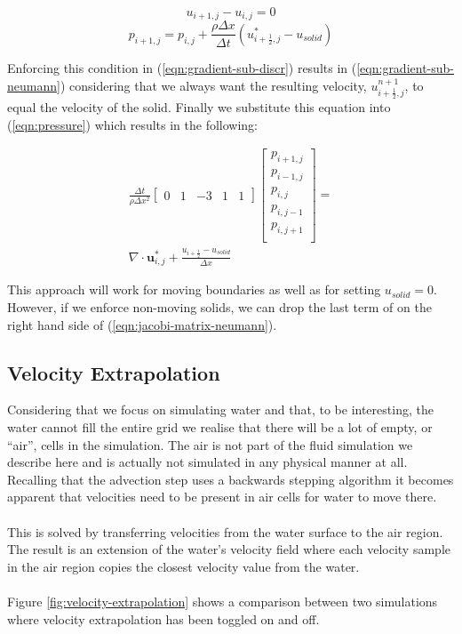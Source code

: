 \documentclass[twocolumn]{article}
\begin{document}
\begin{equation}
  u_{i+1, j} - u_{i, j} = 0
\label{eqn:boundary-neumann}
\end{equation}
\begin{equation}
  p_{i+1, j} = p_{i, j} + \frac{\rho \Delta x}{\Delta t}
    (u_{i+\frac{1}{2}, j}^* - u_{solid})
\label{eqn:gradient-sub-neumann}
\end{equation}

Enforcing this condition in (\ref{eqn:gradient-sub-discr}) results in (\ref{eqn:gradient-sub-neumann}) considering that we always want the resulting velocity, $u_{i+\frac{1}{2}, j}^{n+1}$, to equal the velocity of the solid. Finally we substitute this equation into (\ref{eqn:pressure}) which results in the following:

\begin{equation}
\begin{split}
  \frac{\Delta t}{\rho \Delta x^2}
    \begin{bmatrix}
        0 & 1 & -3 & 1 & 1
    \end{bmatrix}
    \begin{bmatrix}
      p_{i+1, j}\\
      p_{i-1, j}\\
      p_{i, j}\\
      p_{i, j-1}\\
      p_{i, j+1}\\
    \end{bmatrix} =\\
    \nabla \cdot \mathbf{u}^*_{i, j} +
    \frac{u_{i+\frac{1}{2}} - u_{solid}}{\Delta x}
\end{split}
\label{eqn:jacobi-matrix-neumann}
\end{equation}

This approach will work for moving boundaries as well as for setting $u_{solid} = 0$. However, if we enforce non-moving solids, we can drop the last term of on the right hand side of (\ref{eqn:jacobi-matrix-neumann}).


\subsection{Velocity Extrapolation}
Considering that we focus on simulating water and that, to be interesting, the water cannot fill the entire grid we realise that there will be a lot of empty, or ``air'', cells in the simulation. The air is not part of the fluid simulation we describe here and is actually not simulated in any physical manner at all. Recalling that the advection step uses a backwards stepping algorithm it becomes apparent that velocities need to be present in air cells for water to move there.
\\\\
This is solved by transferring velocities from the water surface to the air region. The result is an extension of the water's velocity field where each velocity sample in the air region copies the closest velocity value from the water.
\\\\
Figure \ref{fig:velocity-extrapolation} shows a comparison between two simulations where velocity extrapolation has been toggled on and off.
\end{document}
